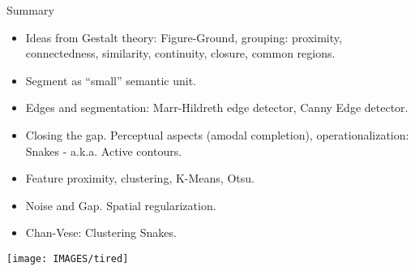 \documentclass[9pt]{beamer}
\begin{document}
\begin{frame}[t]{Summary}
  \begin{center}
    {\fontsize{8}{6}\selectfont
      \begin{itemize}
      \item Ideas from Gestalt theory: Figure-Ground, grouping: proximity, connectedness, similarity, continuity, closure, common regions.
      \item Segment as ``small'' semantic unit.
      \item Edges and segmentation: Marr-Hildreth edge detector, Canny Edge detector.
      \item Closing the gap. Perceptual aspects (amodal completion), operationalization: Snakes - a.k.a. Active contours.
      \item Feature proximity, clustering, K-Means, Otsu.
      \item Noise and Gap. Spatial regularization.
      \item Chan-Vese: Clustering Snakes.
      \end{itemize}
    }
    \end{center}
    \pause
    \begin{center}
  \end{center}
\end{frame}


\begin{frame}
      \texttt{[image: IMAGES/tired]}
\end{frame}
\end{document}
